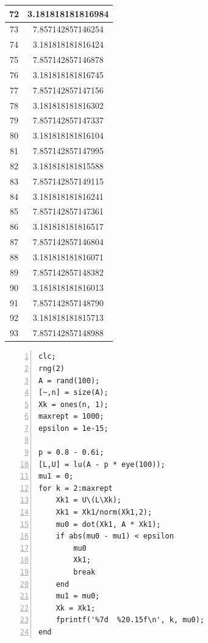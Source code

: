 \documentclass[12pt,a4paper,UTF8]{ctexart}
\begin{document}
\begin{enumerate}
\begin{longtable}{c|c}
72 & 3.181818181816984  \\ \hline
73 & 7.857142857146254  \\ \hline
74 & 3.181818181816424  \\ \hline
75 & 7.857142857146878  \\ \hline
76 & 3.181818181816745  \\ \hline
77 & 7.857142857147156  \\ \hline
78 & 3.181818181816302  \\ \hline
79 & 7.857142857147337  \\ \hline
80 & 3.181818181816104  \\ \hline
81 & 7.857142857147995  \\ \hline
82 & 3.181818181815588  \\ \hline
83 & 7.857142857149115  \\ \hline
84 & 3.181818181816241  \\ \hline
85 & 7.857142857147361  \\ \hline
86 & 3.181818181816517  \\ \hline
87 & 7.857142857146804  \\ \hline
88 & 3.181818181816071  \\ \hline
89 & 7.857142857148382  \\ \hline
90 & 3.181818181816013  \\ \hline
91 & 7.857142857148790  \\ \hline
92 & 3.181818181815713  \\ \hline
93 & 7.857142857148988  \\ \hline
\end{longtable}
	\begin{lstlisting}[numbers=left,frame=single]
clc;
rng(2)
A = rand(100);
[~,n] = size(A);
Xk = ones(n, 1);
maxrept = 1000;
epsilon = 1e-15;

p = 0.8 - 0.6i;
[L,U] = lu(A - p * eye(100));
mu1 = 0;
for k = 2:maxrept
    Xk1 = U\(L\Xk);
    Xk1 = Xk1/norm(Xk1,2);
    mu0 = dot(Xk1, A * Xk1);
    if abs(mu0 - mu1) < epsilon
        mu0
        Xk1;
        break
    end
    mu1 = mu0;
    Xk = Xk1;
    fprintf('%7d  %20.15f\n', k, mu0);
end
	\end{lstlisting}
\end{enumerate}
\end{document}
